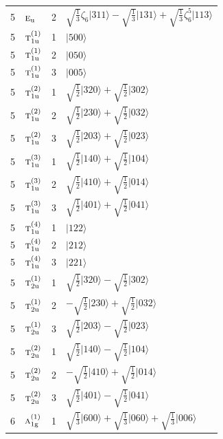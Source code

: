 \documentclass[11pt]{article}
\newcommand{\irr}[1]{\text{\normalfont\scshape #1}}
\newcommand{\ptag}[1]{\mathrm{#1}}
\newcommand{\rootunity}[1]{\zeta_{#1}}
\newcommand{\occ}[1]{\lvert #1\rangle}
\begin{document}
\begin{longtable}{c l c p{}}
5 & $\irr{e}_{\ptag{u}}$ & 2 & $\sqrt{\tfrac{1}{3}}\rootunity{6}\occ{311}-\sqrt{\tfrac{1}{3}}\occ{131}+\sqrt{\tfrac{1}{3}}\rootunity{6}^{5}\occ{113}$\\
5 & $\irr{t}_{1\ptag{u}}^{(1)}$ & 1 & $\occ{500}$\\
5 & $\irr{t}_{1\ptag{u}}^{(1)}$ & 2 & $\occ{050}$\\
5 & $\irr{t}_{1\ptag{u}}^{(1)}$ & 3 & $\occ{005}$\\
5 & $\irr{t}_{1\ptag{u}}^{(2)}$ & 1 & $\sqrt{\tfrac{1}{2}}\occ{320}+\sqrt{\tfrac{1}{2}}\occ{302}$\\
5 & $\irr{t}_{1\ptag{u}}^{(2)}$ & 2 & $\sqrt{\tfrac{1}{2}}\occ{230}+\sqrt{\tfrac{1}{2}}\occ{032}$\\
5 & $\irr{t}_{1\ptag{u}}^{(2)}$ & 3 & $\sqrt{\tfrac{1}{2}}\occ{203}+\sqrt{\tfrac{1}{2}}\occ{023}$\\
5 & $\irr{t}_{1\ptag{u}}^{(3)}$ & 1 & $\sqrt{\tfrac{1}{2}}\occ{140}+\sqrt{\tfrac{1}{2}}\occ{104}$\\
5 & $\irr{t}_{1\ptag{u}}^{(3)}$ & 2 & $\sqrt{\tfrac{1}{2}}\occ{410}+\sqrt{\tfrac{1}{2}}\occ{014}$\\
5 & $\irr{t}_{1\ptag{u}}^{(3)}$ & 3 & $\sqrt{\tfrac{1}{2}}\occ{401}+\sqrt{\tfrac{1}{2}}\occ{041}$\\
5 & $\irr{t}_{1\ptag{u}}^{(4)}$ & 1 & $\occ{122}$\\
5 & $\irr{t}_{1\ptag{u}}^{(4)}$ & 2 & $\occ{212}$\\
5 & $\irr{t}_{1\ptag{u}}^{(4)}$ & 3 & $\occ{221}$\\
5 & $\irr{t}_{2\ptag{u}}^{(1)}$ & 1 & $\sqrt{\tfrac{1}{2}}\occ{320}-\sqrt{\tfrac{1}{2}}\occ{302}$\\
5 & $\irr{t}_{2\ptag{u}}^{(1)}$ & 2 & $-\sqrt{\tfrac{1}{2}}\occ{230}+\sqrt{\tfrac{1}{2}}\occ{032}$\\
5 & $\irr{t}_{2\ptag{u}}^{(1)}$ & 3 & $\sqrt{\tfrac{1}{2}}\occ{203}-\sqrt{\tfrac{1}{2}}\occ{023}$\\
5 & $\irr{t}_{2\ptag{u}}^{(2)}$ & 1 & $\sqrt{\tfrac{1}{2}}\occ{140}-\sqrt{\tfrac{1}{2}}\occ{104}$\\
5 & $\irr{t}_{2\ptag{u}}^{(2)}$ & 2 & $-\sqrt{\tfrac{1}{2}}\occ{410}+\sqrt{\tfrac{1}{2}}\occ{014}$\\
5 & $\irr{t}_{2\ptag{u}}^{(2)}$ & 3 & $\sqrt{\tfrac{1}{2}}\occ{401}-\sqrt{\tfrac{1}{2}}\occ{041}$\\
\hline
6 & $\irr{a}_{1\ptag{g}}^{(1)}$ & 1 & $\sqrt{\tfrac{1}{3}}\occ{600}+\sqrt{\tfrac{1}{3}}\occ{060}+\sqrt{\tfrac{1}{3}}\occ{006}$\\

\end{longtable}
\end{document}
